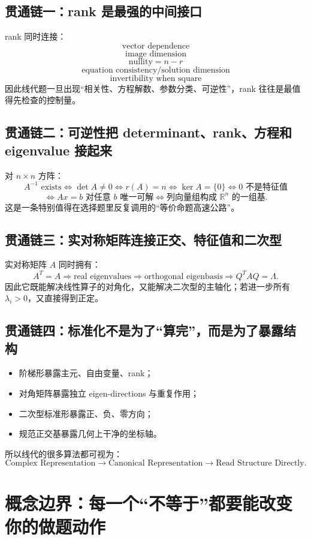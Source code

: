 \documentclass[11pt,a4paper,openany]{ctexbook}
\begin{document}
\section{贯通链一：rank 是最强的中间接口}
rank 同时连接：
\[
\boxed{\text{vector dependence}}
\]
\[
\boxed{\text{image dimension}}
\]
\[
\boxed{\text{nullity}=n-r}
\]
\[
\boxed{\text{equation consistency/solution dimension}}
\]
\[
\boxed{\text{invertibility when square}}
\]
因此线代题一旦出现“相关性、方程解数、参数分类、可逆性”，rank 往往是最值得先检查的控制量。

\section{贯通链二：可逆性把 determinant、rank、方程和 eigenvalue 接起来}
对 $n\times n$ 方阵：
\[
\boxed{
A^{-1}\text{ exists}
\iff \det A\neq0
\iff r(A)=n
\iff \ker A=\{0\}
\iff 0\text{ 不是特征值}
}
\]
\[
\boxed{
\iff Ax=b\text{ 对任意 }b\text{ 唯一可解}
\iff \text{列向量组构成 }\mathbb R^n\text{ 的一组基}.
}
\]
这是一条特别值得在选择题里反复调用的“等价命题高速公路”。

\section{贯通链三：实对称矩阵连接正交、特征值和二次型}
实对称矩阵 $A$ 同时拥有：
\[
A^T=A
\Rightarrow
\text{real eigenvalues}
\Rightarrow
\text{orthogonal eigenbasis}
\Rightarrow
Q^TAQ=\Lambda.
\]
因此它既能解决线性算子的对角化，又能解决二次型的主轴化；若进一步所有 $\lambda_i>0$，又直接得到正定。

\section{贯通链四：标准化不是为了“算完”，而是为了暴露结构}
\begin{itemize}
  \item 阶梯形暴露主元、自由变量、rank；
  \item 对角矩阵暴露独立 eigen-directions 与重复作用；
  \item 二次型标准形暴露正、负、零方向；
  \item 规范正交基暴露几何上干净的坐标轴。
\end{itemize}
所以线代的很多算法都可视为：
\[
\boxed{\text{Complex Representation}\to\text{Canonical Representation}\to\text{Read Structure Directly}.}
\]

\chapter{概念边界：每一个“不等于”都要能改变你的做题动作}
\end{document}
